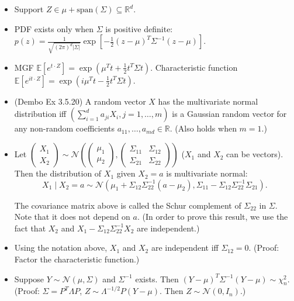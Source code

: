 \documentclass[twoside]{article}
\newcommand\bbE{\mathbb{E}}
\newcommand\bbR{\mathbb{R}}
\newcommand\calN{\mathcal{N}}
\newcommand\Lmb{\Lambda}
\newcommand\Sg{\Sigma}
\begin{document}
\begin{itemize}
\item Support $Z \in \mu + \text{span}(\Sg) \subseteq \bbR^d$.

\item PDF exists only when $\Sg$ is positive definite: $p(z) = \displaystyle\frac{1}{\sqrt{(2\pi)^d |\Sg|}} \exp \left[ -\frac{1}{2}(z - \mu)^T \Sg^{-1} (z-\mu) \right]$.

\item MGF $\bbE [e^{t \cdot Z}] = \exp \left( \mu^T t + \frac{1}{2}t^T \Sg t \right)$. Characteristic function $\bbE [e^{it \cdot Z}] = \exp \left( i\mu^T t - \frac{1}{2}t^T \Sg t \right)$.

\item (Dembo Ex 3.5.20) A random vector $X$ has the multivariate normal distribution iff $\left( \sum_{i=1}^d a_{ji} X_i, j = 1, \dots, m \right)$ is a Gaussian random vector for any non-random coefficients $a_{11}, \dots, a_{md} \in \bbR$. (Also holds when $m = 1$.)

\item Let $\begin{pmatrix} X_1 \\ X_2 \end{pmatrix} \sim \calN \left( \begin{pmatrix} \mu_1 \\ \mu_2 \end{pmatrix}, \begin{pmatrix} \Sg_{11} & \Sg_{12} \\ \Sg_{21} & \Sg_{22} \end{pmatrix} \right)$ ($X_1$ and $X_2$ can be vectors). Then the distribution of $X_1$ given $X_2 = a$ is multivariate normal:
\begin{equation*}
X_1 \mid X_2 = a \sim \calN \left( \mu_1 + \Sg_{12}\Sg_{22}^{-1} (a - \mu_2), \Sg_{11} - \Sg_{12}\Sg_{22}^{-1} \Sg_{21} \right).
\end{equation*}

The covariance matrix above is called the Schur complement of $\Sg_{22}$ in $\Sg$. Note that it does not depend on $a$. (In order to prove this result, we use the fact that $X_2$ and $X_1 - \Sg_{12}\Sg_{22}^{-1}X_2$ are independent.)

\item Using the notation above, $X_1$ and $X_2$ are independent iff $\Sg_{12} = 0$. (Proof: Factor the characteristic function.)

\item Suppose $Y \sim \calN(\mu, \Sg)$ and $\Sg^{-1}$ exists. Then $(Y - \mu)^T \Sg^{-1} (Y - \mu) \sim \chi_n^2$. (Proof: $\Sg = P^T \Lmb P$, $Z \sim \Lmb^{-1/2}P(Y - \mu)$. Then $Z \sim \calN(0, I_n)$.)


\end{itemize}
\end{document}
